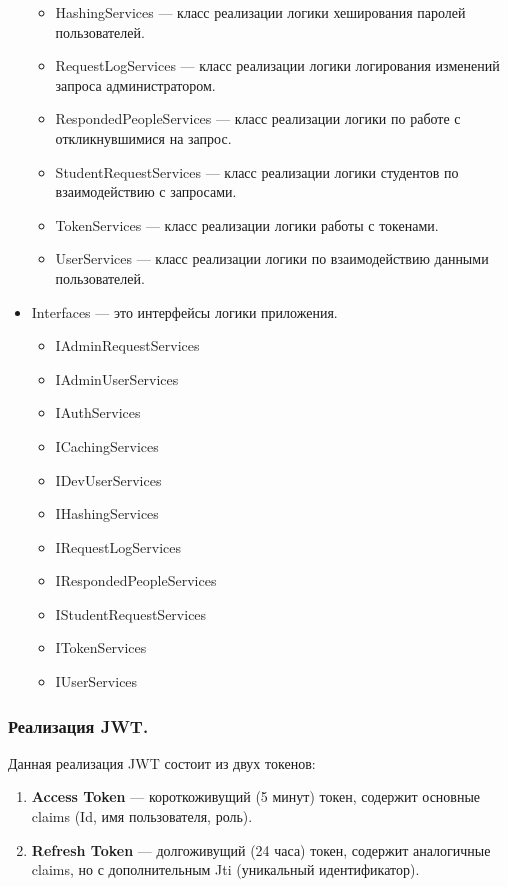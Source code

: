 \begin{itemize}
{\begin{itemize}
				\item{HashingServices --- класс реализации логики хеширования паролей пользователей.}
				\item{RequestLogServices --- класс реализации логики логирования изменений запроса администратором.}
				\item{RespondedPeopleServices --- класс реализации логики по работе с откликнувшимися на запрос.}
				\item{StudentRequestServices --- класс реализации логики студентов по взаимодействию с запросами.}
				\item{TokenServices --- класс реализации логики работы с токенами.}
				\item{UserServices --- класс реализации логики по взаимодействию данными пользователей.}
			\end{itemize}
		}
	\item{Interfaces --- это интерфейсы логики приложения.
			\begin{itemize}
				\item{IAdminRequestServices}
				\item{IAdminUserServices}
				\item{IAuthServices}
				\item{ICachingServices}
				\item{IDevUserServices}
				\item{IHashingServices}
				\item{IRequestLogServices}
				\item{IRespondedPeopleServices}
				\item{IStudentRequestServices}
				\item{ITokenServices}
				\item{IUserServices}
			\end{itemize}
		}
\end{itemize}

\subsubsection{Реализация JWT.}
Данная реализация JWT состоит из двух токенов:
\begin{enumerate}
	\item{\textbf{Access Token} --- короткоживущий (5 минут) токен, содержит основные claims (Id, имя пользователя, роль).}
	\item{\textbf{Refresh Token} --- долгоживущий (24 часа) токен, содержит аналогичные claims, но с дополнительным Jti (уникальный идентификатор).}
\end{enumerate}

